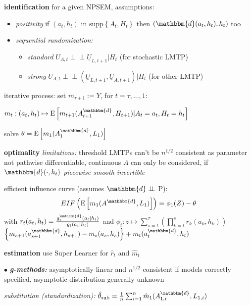 \documentclass[8pt,twoside]{extarticle}
\newcommand{\indep}{\perp \!\!\! \perp}
\begin{document}
\begin{multicols}{2}
\noindent \textbf{identification} for a given NPSEM, assumptions: 

\begin{itemize}[leftmargin=*, itemsep=0em, topsep=0pt, partopsep=0pt,parsep=0pt]
\item \textit{positivity} if $(a_t,h_t)$ in  $\mathrm{supp}\!\left\{A_t,H_t\right\}$ then $ (\mathbbm{d}(a_t,h_t),h_t) $ too
\item \textit{sequential randomization:} 
\begin{itemize}[leftmargin=*, itemsep=0em, topsep=0pt, partopsep=0pt,parsep=0pt]
\item \textit{standard} $U_{A,t}\indep\underline{U}_{L,t+1}|H_t$ (for stochastic LMTP)
\item \textit{strong}  $U_{A,t}\indep(\underline{U}_{L,t+1},\underline{U}_{A,t+1})|H_t$ (for other LMTP)
\end{itemize}
\end{itemize}

\noindent iterative process: set $m_{\tau+1}:=Y$, for $t=\tau,...,1$:

\noindent $m_t: (a_t,h_t) \mapsto \mathrm{E}\left[m_{t+1}(A_{t+1}^{\mathbbm{d}}, H_{t+1})|A_t=a_t,H_t=h_t\right]$

\noindent solve $\theta = \mathrm{E}\left[m_1(A_1^{\mathbbm{d}},L_1)\right]$


\noindent \textbf{optimality}  \textit{limitations:} threshold LMTPs can't be $n^{1/2}$ consistent as parameter not pathwise differentiable,
continuous $A$ can only be considered, if $\mathbbm{d}(\cdot,h_t)$ \textit{piecewise smooth invertible}

\noindent efficient influence curve (assumes $\mathbbm{d} \indep $ P):
$$EIF\left(\mathrm{E}\left[m_1(A^{\mathbbm{d}}, L_1)\right]\right) = \phi_1(Z) - \theta$$ with
$r_t(a_t, h_t) =\frac{g_t^{\mathbbm{d}}(a_t|h_t)}{g_t(a_t|h_t)}  $ and
$\phi_t: z \mapsto \sum_{s=t}^\tau \left(\prod_{k=t}^s r_k(a_k,h_k)\right)$ $\left\{m_{s+1}(a_{s+1}^{\mathbbm{d}},h_{s+1})-m_s(a_s,h_s)\right\} + m_t(a_t^{\mathbbm{d}},h_t)$

\noindent \textbf{estimation}
use Super Learner for $\hat{r}_t$ and $\hat{m}_t$


\noindent $\bullet$ \textit{\textbf{g-methods:}} asymptotically linear and $n^{1/2}$ consistent if models correctly specified, asymptotic distribution generally unknown

\noindent \textit{substitution (standardization):} $\hat{\theta}_{\text{sub}}=\frac{1}{n} \sum_{i=1}^n \hat{m}_1(A^{\mathbbm{d}}_{1,i},L_{1,i})$


\end{multicols}
\end{document}
